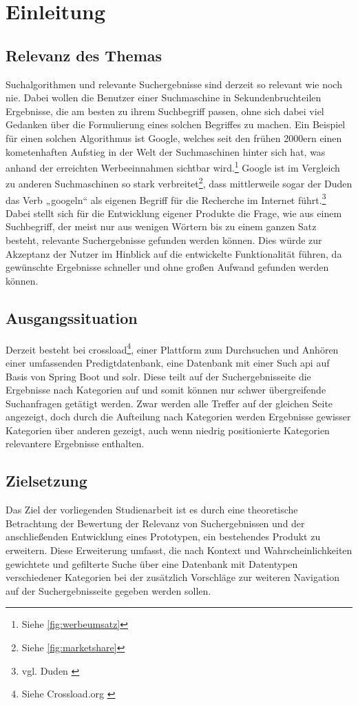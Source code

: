 \chapter{Einleitung}\label{ch:intro}

\section{Relevanz des Themas}
Suchalgorithmen und relevante Suchergebnisse sind derzeit so relevant wie noch nie.
Dabei wollen die Benutzer einer Suchmaschine in Sekundenbruchteilen Ergebnisse, die am besten zu ihrem Suchbegriff passen, ohne sich dabei viel Gedanken über die Formulierung eines solchen Begriffes zu machen.
Ein Beispiel für einen solchen Algorithmus ist Google, welches seit den frühen 2000ern einen kometenhaften Aufstieg in der Welt der Suchmaschinen hinter sich hat, was anhand der erreichten Werbeeinnahmen sichtbar wird.\footnote{Siehe \ref{fig:werbeumsatz}}
Google ist im Vergleich zu anderen Suchmaschinen so stark verbreitet\footnote{Siehe \ref{fig:marketshare}}, dass mittlerweile sogar der Duden das Verb „googeln“ als eigenen Begriff für die Recherche im Internet führt.\footnote{vgl. Duden \cite{duden2022}}
Dabei stellt sich für die Entwicklung eigener Produkte die Frage, wie aus einem Suchbegriff, der meist nur aus wenigen Wörtern bis zu einem ganzen Satz besteht, relevante Suchergebnisse gefunden werden können. Dies würde zur Akzeptanz der Nutzer im Hinblick auf die entwickelte Funktionalität führen, da gewünschte Ergebnisse schneller und ohne großen Aufwand gefunden werden können.

\section{Ausgangssituation}
Derzeit besteht bei \gls{crossload}\footnote{Siehe Crossload.org \cite{pfleiderer2022}}, einer Plattform zum Durchsuchen und Anhören einer umfassenden Predigtdatenbank, eine Datenbank mit einer Such \gls{api} auf Basis von Spring Boot und \gls{solr}. Diese teilt auf der Suchergebnisseite die Ergebnisse nach Kategorien auf und somit können nur schwer übergreifende Suchanfragen getätigt werden. Zwar werden alle Treffer auf der gleichen Seite angezeigt, doch durch die Aufteilung nach Kategorien werden Ergebnisse gewisser Kategorien über anderen gezeigt, auch wenn niedrig positionierte Kategorien relevantere Ergebnisse enthalten.

\section{Zielsetzung}
Das Ziel der vorliegenden Studienarbeit ist es durch eine theoretische Betrachtung der Bewertung der Relevanz von Suchergebnissen und der anschließenden Entwicklung eines Prototypen, ein bestehendes Produkt zu erweitern. Diese Erweiterung umfasst, die nach Kontext und Wahrscheinlichkeiten gewichtete und gefilterte Suche über eine Datenbank mit Datentypen verschiedener Kategorien bei der zusätzlich Vorschläge zur weiteren Navigation auf der Suchergebnisseite gegeben werden sollen.
